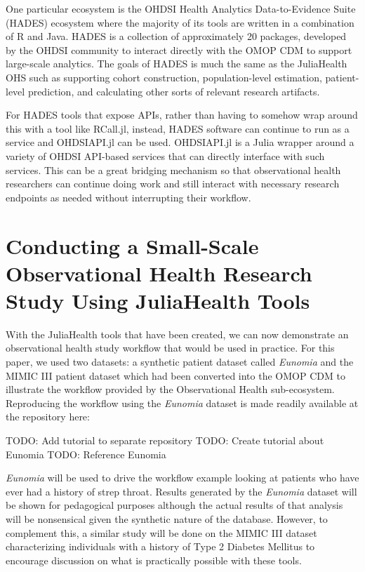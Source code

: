 \documentclass{juliacon}
\begin{document}
One particular ecosystem is the OHDSI Health Analytics Data-to-Evidence Suite (HADES) ecosystem where the majority of its tools are written in a combination of R and Java.
HADES is a collection of approximately 20 packages, developed by the OHDSI community to interact directly with the OMOP CDM to support large-scale analytics.
The goals of HADES is much the same as the JuliaHealth OHS such as supporting cohort construction, population-level estimation, patient-level prediction, and calculating other sorts of relevant research artifacts.

For HADES tools that expose APIs, rather than having to somehow wrap around this with a tool like RCall.jl, instead, HADES software can continue to run as a service and OHDSIAPI.jl can be used.
OHDSIAPI.jl is a Julia wrapper around a variety of OHDSI API-based services that can directly interface with such services.
This can be a great bridging mechanism so that observational health researchers can continue doing work and still interact with necessary research endpoints as needed without interrupting their workflow.

\section{Conducting a Small-Scale Observational Health Research Study Using JuliaHealth Tools}

With the JuliaHealth tools that have been created, we can now demonstrate an observational health study workflow that would be used in practice.
For this paper, we used two datasets: a synthetic patient dataset called \textit{Eunomia} and the MIMIC III patient dataset which had been converted into the OMOP CDM to illustrate the workflow provided by the Observational Health sub-ecosystem.
Reproducing the workflow using the \textit{Eunomia} dataset is made readily available at the repository here: \cite{schuemieEunomia2023}

TODO: Add tutorial to separate repository
TODO: Create tutorial about Eunomia
TODO: Reference Eunomia

\textit{Eunomia} will be used to drive the workflow example looking at patients who have ever had a history of strep throat.
Results generated by the \textit{Eunomia} dataset will be shown for pedagogical purposes although the actual results of that analysis will be nonsensical given the synthetic nature of the database.
However, to complement this, a similar study will be done on the MIMIC III dataset characterizing individuals with a history of Type 2 Diabetes Mellitus to encourage discussion on what is practically possible with these tools.
\end{document}
